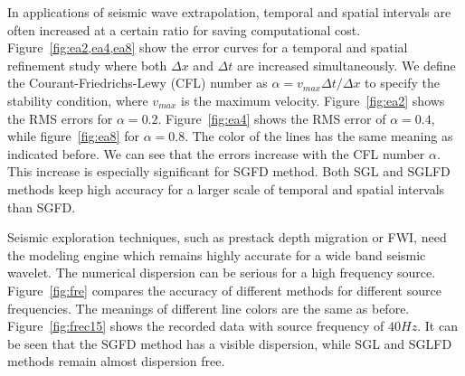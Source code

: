 In applications of seismic wave extrapolation, temporal and spatial intervals are often increased at a 
certain ratio for saving computational cost. Figure~\ref{fig:ea2,ea4,ea8}
show the error curves for a temporal and spatial refinement study where
both $\Delta x$ and $\Delta t$ are increased
simultaneously. We define the Courant-Friedrichs-Lewy (CFL) number as $\alpha=v_{max}\Delta t/\Delta x$ to specify the stability condition, where $v_{max}$ is the maximum velocity. Figure~\ref{fig:ea2} shows the RMS errors for $\alpha= 0.2$. Figure~\ref{fig:ea4} shows the RMS error of $\alpha=0.4$, while figure~\ref{fig:ea8} for $\alpha=0.8$. The color of the lines has the same meaning as indicated before. We can see that the errors increase with the CFL number $\alpha$. This increase is especially significant for SGFD method. Both SGL and SGLFD methods keep high accuracy for a larger scale of temporal and spatial intervals than SGFD. 


Seismic exploration techniques, such as prestack depth migration or FWI, need the modeling engine which remains highly accurate for a wide band seismic wavelet.  The numerical dispersion can be serious for a high frequency source. Figure~\ref{fig:fre} compares the accuracy of different methods for different source frequencies. The meanings of different line colors are the same as before. Figure~\ref{fig:frec15} shows the recorded data with source frequency of $40Hz$.  It can be seen that the SGFD method has a visible dispersion, while SGL and SGLFD methods remain almost dispersion free.


